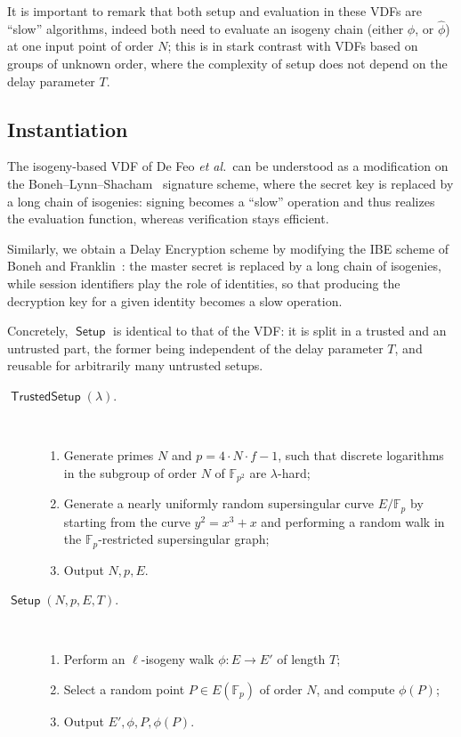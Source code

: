 \documentclass{llncs}
\newcommand{\F}{\mathbb{F}}
\DeclareMathOperator{\Setup}{\mathsf{Setup}}
\DeclareMathOperator{\TSetup}{\mathsf{TrustedSetup}}
\begin{document}
It is important to remark that both setup and evaluation in these VDFs
are ``slow'' algorithms, indeed both need to evaluate an isogeny chain
(either $\phi$, or $\hat\phi$) at one input point of order $N$; this
is in stark contrast with VDFs based on groups of unknown order, where
the complexity of setup does not depend on the delay parameter $T$.


\subsection{Instantiation}

The isogeny-based VDF of De Feo \emph{et al.}\ can be understood as a
modification on the Boneh--Lynn--Shacham~\cite{boneh+lynn+shacham04}
signature scheme, where the secret key is replaced by a long chain of
isogenies: signing becomes a ``slow'' operation and thus realizes the
evaluation function, whereas verification stays efficient.

Similarly, we obtain a Delay Encryption scheme by modifying the IBE
scheme of Boneh and Franklin~\cite{10.1007/3-540-44647-8_13}: the
master secret is replaced by a long chain of isogenies, while session
identifiers play the role of identities, so that producing the
decryption key for a given identity becomes a slow operation.

Concretely, $\Setup$ is identical to that of the VDF: it is split in a
trusted and an untrusted part, the former being independent of the
delay parameter $T$, and reusable for arbitrarily many untrusted
setups.

\begin{description}
\item[$\TSetup(\lambda)$.]\
  \begin{enumerate}
  \item Generate primes $N$ and $p=4\cdot N\cdot f - 1$, such that
    discrete logarithms in the subgroup of order $N$ of $\F_{p^2}$ are
    $\lambda$-hard;
  \item Generate a nearly uniformly random supersingular curve
    $E/\F_p$ by starting from the curve $y^2=x^3+x$ and performing a
    random walk in the $\F_p$-restricted supersingular graph;
  \item Output $N,p,E$.
  \end{enumerate}
\item[$\Setup(N,p,E,T)$.]\
  \begin{enumerate}
  \item Perform an $\ell$-isogeny walk $\phi:E\to E'$ of length $T$;
  \item Select a random point $P\in E(\F_p)$ of order $N$, and compute
    $\phi(P)$;
  \item Output $E',\phi,P,\phi(P)$.
  \end{enumerate}
\end{description}
\end{document}
